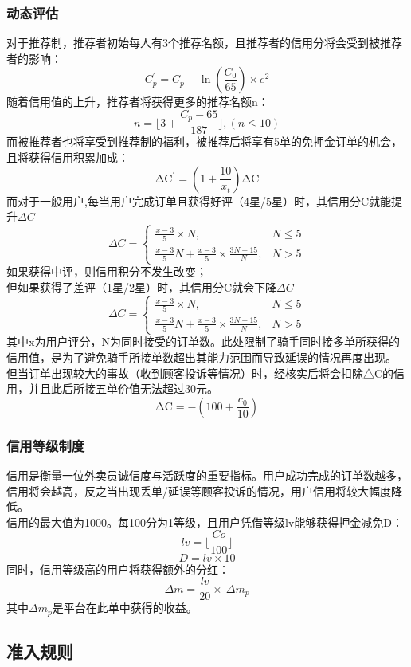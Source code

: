 \documentclass[UTF8]{ctexart}
\begin{document}
\begin{multicols}{2}
  \subsubsection{动态评估}
  对于推荐制，推荐者初始每人有3个推荐名额，且推荐者的信用分将会受到被推荐者的影响：
  $$C_p^\prime=C_p-\ln(\frac{C_0}{65})\times e^2$$
  \indent 随着信用值的上升，推荐者将获得更多的推荐名额n：
  $$n=\lfloor 3+\frac{C_p-65}{187} \rfloor ,(n \leq 10)$$
  \indent 而被推荐者也将享受到推荐制的福利，被推荐后将享有5单的免押金订单的机会，且将获得信用积累加成：
  $$\mathrm{\Delta C}^\prime=(1+\frac{10}{x_t} )\mathrm{\Delta C}$$
  \indent 而对于一般用户,每当用户完成订单且获得好评（4星/5星）时，其信用分C就能提升$\Delta C$
  $$\Delta C=\left\{
    \begin{array}{lr}
    \frac{x-3}{5} \times N, & {N \leq 5} \\
    \frac{x-3}{5} N + \frac{x-3}{5}\times \frac{3N-15}{N} ,& {N > 5}
  \end{array}\right.
  $$
  \indent 如果获得中评，则信用积分不发生改变；\\
  \indent 但如果获得了差评（1星/2星）时，其信用分C就会下降$\Delta C$
  $$\Delta C=\left\{
    \begin{array}{lr}
    \frac{x-3}{5} \times N, & {N \leq 5} \\
    \frac{x-3}{5} N + \frac{x-3}{5}\times \frac{3N-15}{N}, & {N > 5}
  \end{array}\right.
$$
  \indent 其中x为用户评分，N为同时接受的订单数。此处限制了骑手同时接多单所获得的信用值，是为了避免骑手所接单数超出其能力范围而导致延误的情况再度出现。\\
  \indent 但当订单出现较大的事故（收到顾客投诉等情况）时，经核实后将会扣除△C的信用，并且此后所接五单价值无法超过30元。
  $$\mathrm{\Delta C}=-\left(100+\frac{c_0}{10}\right)$$
  \subsubsection{信用等级制度}
  \indent 信用是衡量一位外卖员诚信度与活跃度的重要指标。用户成功完成的订单数越多，信用将会越高，反之当出现丢单/延误等顾客投诉的情况，用户信用将较大幅度降低。\\
  \indent 信用的最大值为1000。每100分为1等级，且用户凭借等级lv能够获得押金减免D：
  $$lv=\lfloor \frac{Co}{100}\rfloor$$
  $$D=lv\times10$$
 同时，信用等级高的用户将获得额外的分红：
$$\Delta m=\frac{lv}{20}\times\ \Delta m_p$$
其中$\Delta m_p$是平台在此单中获得的收益。

  \subsection{准入规则}

\end{multicols}
\end{document}

